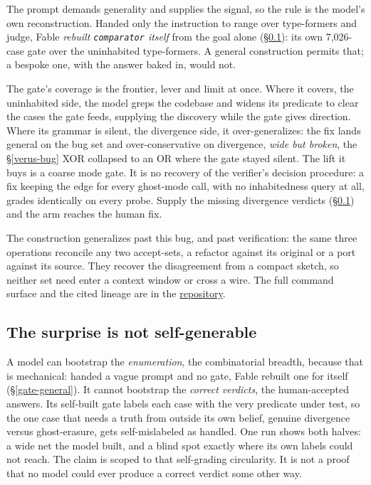 \documentclass[
  10pt,
]{article}
\begin{document}
The prompt demands generality and supplies the signal, so the rule is
the model's own reconstruction. Handed only the instruction to range
over type-formers and judge, Fable \emph{rebuilt \texttt{comparator}
itself} from the goal alone (\S\ref{enum-calib}): its own 7,026-case
gate over the uninhabited type-formers. A general construction permits
that; a bespoke one, with the answer baked in, would not.

The gate's coverage is the frontier, lever and limit at once. Where it
covers, the uninhabited side, the model greps the codebase and widens
its predicate to clear the cases the gate feeds, supplying the discovery
while the gate gives direction. Where its grammar is silent, the
divergence side, it over-generalizes: the fix lands general on the bug
set and over-conservative on divergence, \emph{wide but broken}, the
\S\ref{verus-bug} XOR collapsed to an OR where the gate stayed silent.
The lift it buys is a coarse mode gate. It is no recovery of the
verifier's decision procedure: a fix keeping the edge for every
ghost-mode call, with no inhabitedness query at all, grades identically
on every probe. Supply the missing divergence verdicts
(\S\ref{enum-calib}) and the arm reaches the human fix.

The construction generalizes past this bug, and past verification: the
same three operations reconcile any two accept-sets, a refactor against
its original or a port against its source. They recover the disagreement
from a compact sketch, so neither set need enter a context window or
cross a wire. The full command surface and the cited lineage are in the
\href{https://anonymous.4open.science/r/comparator-DA10}{repository}.

\subsection{The surprise is not self-generable}\label{enum-calib}

A model can bootstrap the \emph{enumeration}, the combinatorial breadth,
because that is mechanical: handed a vague prompt and no gate, Fable
rebuilt one for itself (\S\ref{gate-general}). It cannot bootstrap the
\emph{correct verdicts}, the human-accepted answers. Its self-built gate
labels each case with the very predicate under test, so the one case
that needs a truth from outside its own belief, genuine divergence
versus ghost-erasure, gets self-mislabeled as handled. One run shows
both halves: a wide net the model built, and a blind spot exactly where
its own labels could not reach. The claim is scoped to that self-grading
circularity. It is not a proof that no model could ever produce a
correct verdict some other way.
\end{document}
